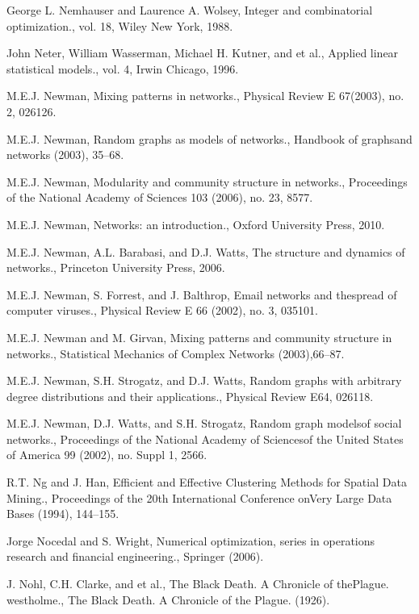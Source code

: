 \begin{thebibliography}{999}
 George L. Nemhauser and Laurence A. Wolsey, Integer and combinatorial optimization., vol. 18, Wiley New York, 1988.

 John Neter, William Wasserman, Michael H. Kutner, and et al., Applied linear statistical models., vol. 4, Irwin Chicago, 1996.

 M.E.J. Newman, Mixing patterns in networks., Physical Review E 67(2003), no. 2, 026126.

 M.E.J. Newman, Random graphs as models of networks., Handbook of graphsand networks (2003), 35–68.

 M.E.J. Newman, Modularity and community structure in networks., Proceedings of the National Academy of Sciences 103 (2006), no. 23, 8577.

 M.E.J. Newman, Networks: an introduction., Oxford University Press, 2010.

 M.E.J. Newman, A.L. Barabasi, and D.J. Watts, The structure and dynamics of networks., Princeton University Press, 2006.

 M.E.J. Newman, S. Forrest, and J. Balthrop, Email networks and thespread of computer viruses., Physical Review E 66 (2002), no. 3, 035101.

 M.E.J. Newman and M. Girvan, Mixing patterns and community structure in networks., Statistical Mechanics of Complex Networks (2003),66–87.

 M.E.J. Newman, S.H. Strogatz, and D.J. Watts, Random graphs with arbitrary degree distributions and their applications., Physical Review E64, 026118.

 M.E.J. Newman, D.J. Watts, and S.H. Strogatz, Random graph modelsof social networks., Proceedings of the National Academy of Sciencesof the United States of America 99 (2002), no. Suppl 1, 2566.

 R.T. Ng and J. Han, Efficient and Effective Clustering Methods for Spatial Data Mining., Proceedings of the 20th International Conference onVery Large Data Bases (1994), 144–155.

 Jorge Nocedal and S. Wright, Numerical optimization, series in operations research and financial engineering., Springer (2006).

 J. Nohl, C.H. Clarke, and et al., The Black Death. A Chronicle of thePlague. westholme., The Black Death. A Chronicle of the Plague. (1926).


\end{thebibliography}
